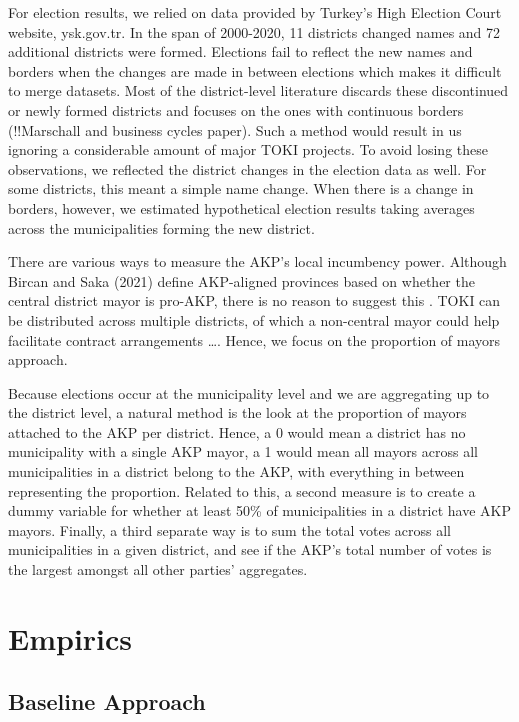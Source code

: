 \documentclass[10pt, oneside]{article}   	%
\numberwithin{equation}{section}
\begin{document}
For election results, we relied on data provided by Turkey's High Election Court website, ysk.gov.tr. In the span of 2000-2020, 11 districts changed names and 72 additional districts were formed. Elections fail to reflect the new names and borders when the changes are made in between elections which makes it difficult to merge datasets. Most of the district-level literature discards these discontinued or newly formed districts and focuses on the ones with continuous borders (!!Marschall and business cycles paper). Such a method would result in us ignoring a considerable amount of major TOKI projects. To avoid losing these observations, we reflected the district changes in the election data as well. For some districts, this meant a simple name change. When there is a change in borders, however, we estimated hypothetical election results taking averages across the municipalities forming the new district.

There are various ways to measure the AKP's local incumbency power. Although Bircan and Saka (2021) define AKP-aligned provinces based on whether the central district mayor is pro-AKP, there is no reason to suggest this . TOKI can be distributed across multiple districts, of which a non-central mayor could help facilitate contract arrangements \dots . Hence, we focus on the proportion of mayors approach. 

Because elections occur at the municipality level and we are aggregating up to the district level, a natural method is the look at the proportion of mayors attached to the AKP per district. Hence, a 0 would mean a district has no municipality with a single AKP mayor, a 1 would mean all mayors across all municipalities in a district belong to the AKP, with everything in between representing the proportion. Related to this, a second measure is to create a dummy variable for whether at least 50\% of municipalities in a district have AKP mayors. Finally, a third separate way is to sum the total votes across all municipalities in a given district, and see if the AKP's total number of votes is the largest amongst all other parties' aggregates. 



\section{Empirics}

\subsection{Baseline Approach}
\end{document}
